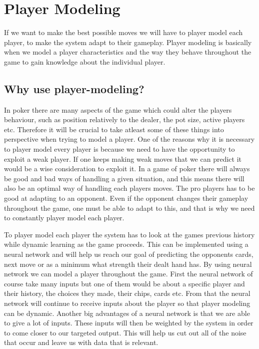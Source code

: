 \section{Player Modeling}
If we want to make the best possible moves we will have to player model each player, to make the system adapt to their gameplay.
Player modeling is basically when we model a player characteristics and the way they behave throughout the game to gain knowledge about the individual player. 
\subsection{Why use player-modeling?}
In poker there are many aspects of the game which could alter the players behaviour, such as position relatively to the dealer, the pot size, active players etc. Therefore it will be crucial to take atleast some of these things into perspective when trying to model a player. One of the reasons why it is necessary to player model every player is because we need to have the opportunity to exploit a weak player. If one keeps making weak moves that we can predict it would be a wise consideration to exploit it.
In a game of poker there will always be good and bad ways of handling a given situation, and this means there will also be an optimal way of handling each players moves. 
The pro players has to be good at adapting to an opponent. Even if the opponent changes their gameplay throughout the game, one must be able to adapt to this, and that is why we need to constantly player model each player.


To player model each player the system has to look at the games previous history while dynamic learning as the game proceeds.
This can be implemented using a neural network and will help us reach our goal of predicting the opponents cards, next move or as a minimum what strength their dealt hand has. By using neural network we can model a player throughout the game. First the neural network of course take many inputs but one of them would be about a specific player and their history, the choices they made, their chips, cards etc. From that the neural network will continue to receive inputs about the player so that player modeling can be dynamic.
Another big advantages of a neural network is that we are able to give a lot of inputs. These inputs will then be weighted by the system in order to come closer to our targeted output.
This will help us cut out all of the noise that occur and leave us with data that is relevant.



